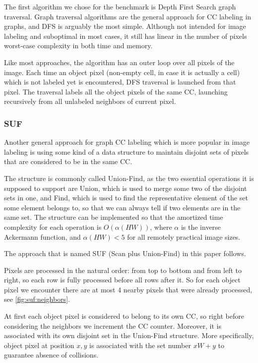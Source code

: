 \documentclass{llncs}
\begin{document}
The first algorithm we chose for the benchmark is Depth First Search graph traversal.
Graph traversal algorithms are the general approach for CC labeling in graphs, and
DFS is arguably the most simple.
Although not intended for image labeling and
suboptimal in most cases, it still has linear in the number of pixels worst-case
complexity in both time and memory.

Like most approaches, the algorithm has an outer loop over all pixels of the image.
Each time an object pixel (non-empty cell, in case it is actually a cell)
which is not labeled yet is encountered, DFS traversal is launched from that pixel.
The traversal labels all the object pixels of the same CC, launching recursively
from all unlabeled neighbors of current pixel.

\subsubsection{SUF}

Another general approach for graph CC labeling which is more popular in image
labeling is using some kind of a data structure to maintain disjoint sets of pixels
that are considered to be in the same CC.

The structure is commonly called Union-Find, as the two essential operations
it is supposed to support are Union, which is used to merge some two of the
disjoint sets in one, and Find, which is used to find the representative element
of the set some element belongs to, so that we can always tell if two elements are
in the same set.
The structure can be implemented so that the amortized time complexity for each
operation is $O(\alpha(HW))$, where $\alpha$ is the inverse Ackermann function,
and $\alpha(HW) < 5$ for all remotely practical image sizes. %

The approach that is named SUF (Scan plus Union-Find) in this paper follows.

Pixels are processed in the natural order: from top to bottom and from
left to right, so each row is fully processed before all rows after it.
So for each object pixel we encounter there are at most 4 nearby pixels
that were already processed, see \autoref{fig:suf:neighbors}.

At first each object pixel is considered to belong to its own CC, so right before
considering the neighbors we increment the CC counter.
Moreover, it is associated with its own disjoint set in the Union-Find structure.
More specifically, object pixel at position $x, y$ is associated with
the set number $xW + y$ to guarantee absence of collisions.
\end{document}
